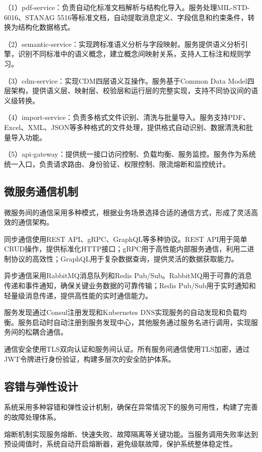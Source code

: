（1）pdf-service：负责自动化标准文档解析与结构化导入。服务处理MIL-STD-6016、STANAG 5516等标准文档，自动提取消息定义、字段信息和约束条件，转换为结构化数据格式。

（2）semantic-service：实现跨标准语义分析与字段映射。服务提供语义分析引擎，识别不同标准中的语义概念，建立概念间映射关系，支持人工标注和规则学习。

（3）cdm-service：实现CDM四层语义互操作。服务基于Common Data Model四层架构，提供语义层、映射层、校验层和运行层的完整实现，支持不同协议间的语义级转换。

（4）import-service：负责多格式文件识别、清洗与批量导入。服务支持PDF、Excel、XML、JSON等多种格式的文件处理，提供格式自动识别、数据清洗和批量导入功能。

（5）api-gateway：提供统一接口访问控制、负载均衡、服务监控。服务作为系统统一入口，负责请求路由、身份验证、权限控制、限流熔断和监控统计。

\subsection{微服务通信机制}

微服务间的通信采用多种模式，根据业务场景选择合适的通信方式，形成了灵活高效的通信架构。

同步通信使用REST API、gRPC、GraphQL等多种协议。REST API用于简单CRUD操作，提供标准化HTTP接口；gRPC用于高性能内部服务通信，利用二进制协议的高效性；GraphQL用于复杂数据查询，提供灵活的数据获取能力。

异步通信采用RabbitMQ消息队列和Redis Pub/Sub。RabbitMQ用于可靠的消息传递和事件通知，确保关键业务数据的可靠传输；Redis Pub/Sub用于实时通知和轻量级消息传递，提供高性能的实时通信能力。

服务发现通过Consul注册发现和Kubernetes DNS实现服务的自动发现和负载均衡。服务启动时自动注册到服务发现中心，其他服务通过服务名进行调用，实现服务间的松耦合通信。

通信安全使用TLS双向认证和服务间认证。所有服务间通信使用TLS加密，通过JWT令牌进行身份验证，构建多层次的安全防护体系。

\subsection{容错与弹性设计}

系统采用多种容错和弹性设计机制，确保在异常情况下的服务可用性，构建了完善的故障处理体系。

熔断机制实现服务熔断、快速失败、故障隔离等关键功能。当服务调用失败率达到预设阈值时，系统自动开启熔断器，避免级联故障，保护系统整体稳定性。

